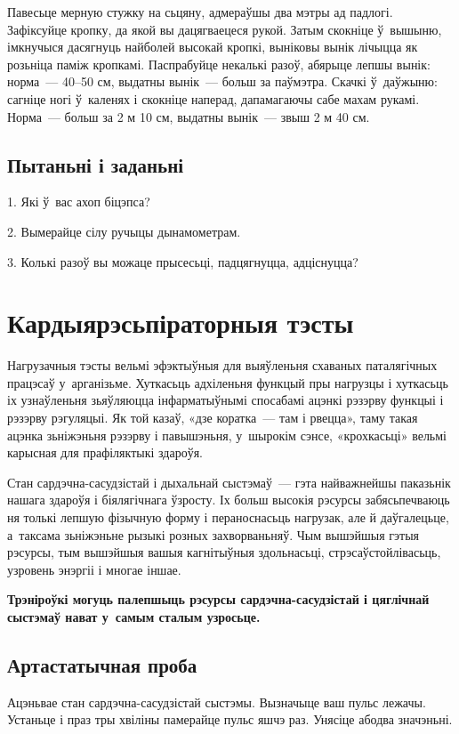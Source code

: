 Павесьце мерную стужку на сьцяну, адмераўшы два мэтры ад падлогі. Зафіксуйце кропку, да якой вы дацягваецеся рукой. Затым скокніце ў~вышыню, імкнучыся дасягнуць найболей высокай кропкі, выніковы вынік лічыцца як розьніца паміж кропкамі. Паспрабуйце некалькі разоў, абярыце лепшы вынік: норма~--- 40--50 см, выдатны вынік~--- больш за паўмэтра. Скачкі ў~даўжыню: сагніце ногі ў~каленях і скокніце наперад, дапамагаючы сабе махам рукамі. Норма~--- больш за 2 м 10 см, выдатны вынік~--- звыш 2 м 40 см.

\subsection*{Пытаньні і заданьні}

1. Які ў~вас ахоп біцэпса?

2. Вымерайце сілу ручыцы дынамометрам.

3. Колькі разоў вы можаце прысесьці, падцягнуцца, адціснуцца?


\section{Кардыярэсьпіраторныя тэсты}

Нагрузачныя тэсты вельмі эфэктыўныя для выяўленьня схаваных паталягічных працэсаў у~арганізьме. Хуткасьць адхіленьня функцый пры нагрузцы і хуткасьць іх узнаўленьня зьяўляюцца інфарматыўнымі спосабамі ацэнкі рэзэрву функцыі і рэзэрву рэгуляцыі. Як той казаў, «дзе коратка~--- там і рвецца», таму такая ацэнка зьніжэньня рэзэрву і павышэньня, у~шырокім сэнсе, «крохкасьці» вельмі карысная для прафіляктыкі здароўя.

Стан сардэчна-сасудзістай і дыхальнай сыстэмаў~--- гэта найважнейшы паказьнік нашага здароўя і біялягічнага ўзросту. Іх больш высокія рэсурсы забясьпечваюць ня толькі лепшую фізычную форму і пераноснасьць нагрузак, але й даўгалецьце, а~таксама зьніжэньне рызыкі розных захворваньняў. Чым вышэйшыя гэтыя рэсурсы, тым вышэйшыя вашыя кагнітыўныя здольнасьці, стрэсаўстойлівасьць, узровень энэргіі і многае іншае. 

\textbf{Трэніроўкі могуць палепшыць рэсурсы сардэчна-са\-су\-дзіс\-тай і цяглічнай сыстэмаў нават у~самым сталым узросьце.}

\subsection*{Артастатычная проба}

Ацэньвае стан сардэчна-сасудзістай сыстэмы. Вызначыце ваш пульс лежачы. Устаньце і праз тры хвіліны памерайце пульс яшчэ раз. Унясіце абодва значэньні. 

